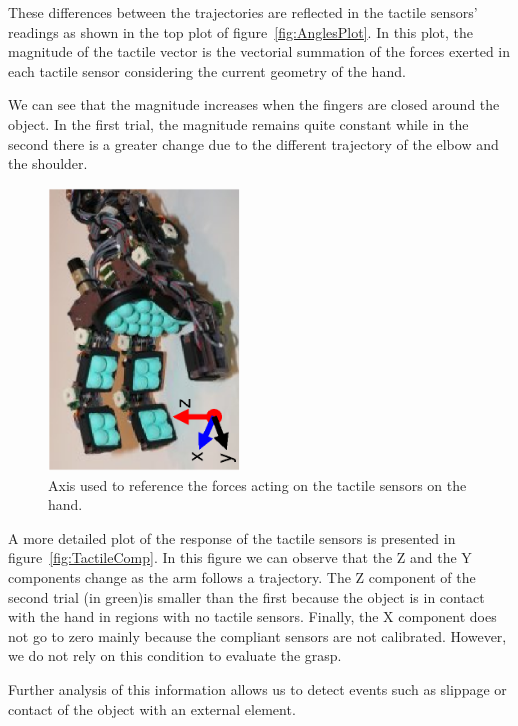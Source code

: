 These differences between the trajectories are reflected in the
tactile sensors' readings as shown in the top plot of
figure~\ref{fig:AnglesPlot}. In this plot, the magnitude of the
tactile vector is the vectorial summation of the forces exerted in
each tactile sensor considering the current geometry of the hand.

We can see that the magnitude increases when the fingers are
closed around the object. In the first trial, the magnitude
remains quite constant while in the second there is a greater
change due to the different trajectory of the elbow and the
shoulder.

\begin{figure}[tbp]
\centerline{
\includegraphics[width=2.0in, angle=270 ]{./figures/refaxis.eps}
} \caption[Axis of reference for tactile sensors]{Axis used to
reference the forces acting on the tactile sensors on the hand.}
\label{fig:tactileref}
\end{figure}



A more detailed plot of the response of the tactile sensors is
presented in figure~\ref{fig:TactileComp}. In this figure we can
observe that the Z and the Y components change as the arm follows
a trajectory. The Z component of the second trial (in green)is
smaller than the first because the object is in contact with the
hand in regions with no tactile sensors. Finally, the X component
does not go to zero mainly because the compliant sensors are not
calibrated. However, we do not rely on this condition to evaluate
the grasp.



Further analysis of this information allows us to detect events
such as slippage or contact of the object with an external
element.

